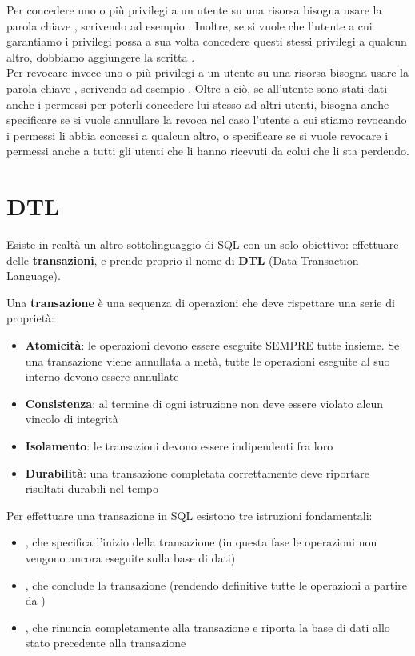 \documentclass[11pt, a4paper, titlepage, oneside]{scrbook}
\begin{document}
Per concedere uno o più privilegi a un utente su una risorsa bisogna usare la parola chiave , scrivendo ad esempio \mbox{}. Inoltre, se si vuole che l'utente a cui garantiamo i privilegi possa a sua volta concedere questi stessi privilegi a qualcun altro, dobbiamo aggiungere la scritta . \\
Per revocare invece uno o più privilegi a un utente su una risorsa bisogna usare la parola chiave , scrivendo ad esempio . Oltre a ciò, se all'utente sono stati dati anche i permessi per poterli concedere lui stesso ad altri utenti, bisogna anche specificare  se si vuole annullare la revoca nel caso l'utente a cui stiamo revocando i permessi li abbia concessi a qualcun altro, o specificare  se si vuole revocare i permessi anche a tutti gli utenti che li hanno ricevuti da colui che li sta perdendo.

\section{DTL}

Esiste in realtà un altro sottolinguaggio di SQL con un solo obiettivo: effettuare delle \textbf{transazioni}, e prende proprio il nome di \textbf{DTL} (Data Transaction Language).

\begin{Definizione}[Transazione]
\label{def-transazione}
Una \textbf{transazione} è una sequenza di operazioni che deve rispettare una serie di proprietà:
\begin{itemize}
    \item \textbf{Atomicità}: le operazioni devono essere eseguite SEMPRE tutte insieme. Se una transazione viene annullata a metà, tutte le operazioni eseguite al suo interno devono essere annullate
    \item \textbf{Consistenza}: al termine di ogni istruzione non deve essere violato alcun vincolo di integrità
    \item \textbf{Isolamento}: le transazioni devono essere indipendenti fra loro
    \item \textbf{Durabilità}: una transazione completata correttamente deve riportare risultati durabili nel tempo 
\end{itemize}
\end{Definizione}

Per effettuare una transazione in SQL esistono tre istruzioni fondamentali:
\begin{itemize}
    \item {}, che specifica l'inizio della transazione (in questa fase le operazioni non vengono ancora eseguite sulla base di dati)
    \item {}, che conclude la transazione (rendendo definitive tutte le operazioni a partire da )
    \item {}, che rinuncia completamente alla transazione e riporta la base di dati allo stato precedente alla transazione
\end{itemize}
\end{document}
